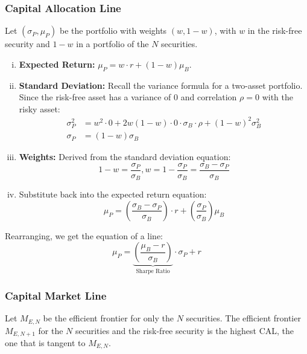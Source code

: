 \subsubsection{Capital Allocation Line}
Let \((\sigma_P, \mu_P)\) be the portfolio with weights \((w,1-w)\), with \(w\) in the risk-free security and \(1-w\) in a portfolio of the \(N\) securities.
\begin{enumerate}[i.]
    \item \textbf{Expected Return: } \(\mu_P = w \cdot r + (1-w)\mu_B\).

    \item \textbf{Standard Deviation: } Recall the variance formula for a two-asset portfolio. Since the risk-free asset has a variance of \(0\) and correlation \(\rho = 0\) with the risky asset:
    \begin{align*}
        \sigma_P^2 &= w^2 \cdot 0 + 2w(1-w) \cdot 0 \cdot \sigma_B \cdot \rho + (1-w)^2 \sigma_B^2 \\
        \sigma_P &= (1-w)\sigma_B
    \end{align*}

    \item \textbf{Weights: } Derived from the standard deviation equation:
    \begin{equation*}
        1-w = \frac{\sigma_P}{\sigma_B}, w = 1 - \frac{\sigma_P}{\sigma_B} = \frac{\sigma_B - \sigma_P}{\sigma_B}
    \end{equation*}

    \item Substitute back into the expected return equation:
    \begin{equation*}
        \mu_P = \left( \frac{\sigma_B - \sigma_P}{\sigma_B} \right) \cdot r + \left( \frac{\sigma_P}{\sigma_B} \right) \mu_B
    \end{equation*}
\end{enumerate}
Rearranging, we get the equation of a line:
\[
\boxed{\mu_P = \underbrace{\left( \frac{\mu_B - r}{\sigma_B} \right)}_{\text{Sharpe Ratio}} \cdot \sigma_P + r}
\]

\subsubsection{Capital Market Line}
Let \(M_{E, N}\) be the efficient frontier for only the \(N\) securities. The efficient frontier \(M_{E, N+1}\) for the \(N\) securities and the risk-free security is the highest CAL, the one that is tangent to \(M_{E, N}\).

